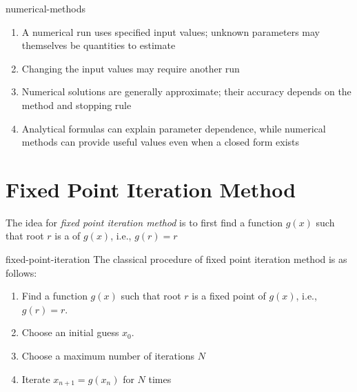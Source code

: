 \documentclass[12pt]{article}
\numberwithin{figure}{section}
\begin{document}
\begin{rem}{numerical-methods}
  \begin{enumerate}[nosep] 
    \item A numerical run uses specified input values; unknown parameters may themselves be quantities to estimate
    \item Changing the input values may require another run
    \item Numerical solutions are generally approximate; their accuracy depends on the method and stopping rule
    \item Analytical formulas can explain parameter dependence, while numerical methods can provide useful values even when a closed form exists
  \end{enumerate}

\end{rem} 


\section{Fixed Point Iteration Method} 

\begin{dfn}
  The idea for \emph{fixed point iteration method} is to first find a function $g(x)$ such that root $r$ is a  of $g(x)$, i.e., $g(r) = r$
\end{dfn}

\begin{conv}{fixed-point-iteration}
  The classical procedure of fixed point iteration method is as follows: 
  \begin{enumerate}[nosep]
    \item Find a function $g(x)$ such that root $r$ is a fixed point of $g(x)$, i.e., $g(r) = r$.
    \item Choose an initial guess $x_0$.
    \item Choose a maximum number of iterations $N$ 
    \item Iterate $x_{n+1} = g(x_n)$ for $N$ times 
  \end{enumerate} 
\end{conv}
\end{document}
